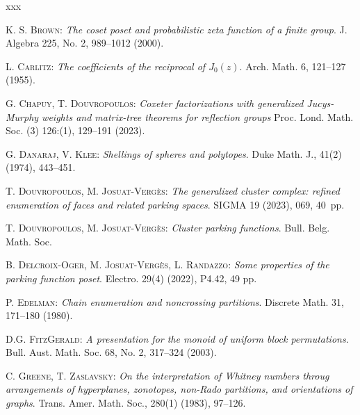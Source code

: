 \documentclass[11pt]{article}
\theoremstyle{definition}
\begin{document}
\begin{thebibliography}{xxx}


    \textsc{K. S. Brown}:
    {\it The coset poset and probabilistic zeta function of a finite group}.
    J. Algebra 225, No. 2, 989--1012 (2000).

    \textsc{L. Carlitz}:
    {\it The coefficients of the reciprocal of $J_0(z)$}.
    Arch. Math. 6, 121--127 (1955).

    \textsc{G. Chapuy, T. Douvropoulos}:
    {\it Coxeter factorizations with generalized {J}ucys-{M}urphy weights and matrix-tree theorems for reflection groups}
    Proc. Lond. Math. Soc. (3) 126:(1), 129--191 (2023).


    \textsc{G. Danaraj, V. Klee}: {\it Shellings of spheres and polytopes}. 
    Duke Math. J., 41(2) (1974), 443--451.

    \textsc{T. Douvropoulos, M. Josuat-Vergès}:
    {\it The generalized cluster complex: refined enumeration of faces and related parking spaces}. 
    SIGMA 19 (2023), 069, 40~pp.

    \textsc{T. Douvropoulos, M. Josuat-Vergès}:
    {\it Cluster parking functions}.
    Bull. Belg. Math. Soc. 

    \textsc{B. Delcroix-Oger, M. Josuat-Vergès, L. Randazzo}: 
    {\it Some properties of the parking function poset}.
    Electro. 29(4) (2022), P4.42, 49 pp.

    \textsc{P. Edelman}:
    {\it Chain enumeration and noncrossing partitions}.
    Discrete Math. 31, 171--180 (1980).

    \textsc{D.G. FitzGerald}:
    {\it A presentation for the monoid of uniform block permutations}.
    Bull. Aust. Math. Soc. 68, No. 2, 317--324 (2003).

    \textsc{C. Greene, T. Zaslavsky}:
    {\it On the interpretation of Whitney numbers throug arrangements of hyperplanes, zonotopes, non-Rado partitions, and orientations of graphs}.
    Trans. Amer. Math. Soc., 280(1) (1983), 97--126.
 

\end{thebibliography}
\end{document}
